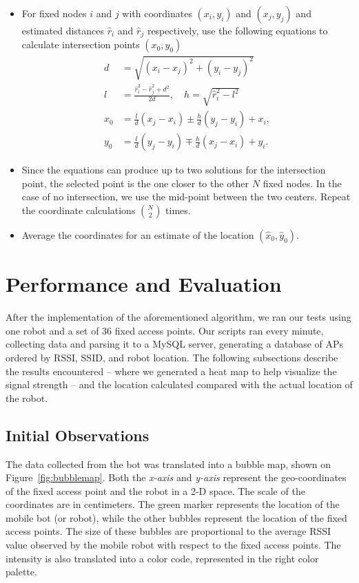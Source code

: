 \documentclass[journal]{IEEEtran} 				\IEEEoverridecommandlockouts 						\usepackage{amsmath,amssymb}
\begin{document}
 \begin{itemize}
 \item For fixed nodes $i$ and $j$ with coordinates $(x_i,y_i)$ and $(x_j,y_j)$ and estimated distances $\hat{r}_i$ and $\hat{r}_j$ respectively, use the following equations to calculate intersection points $(x_0,y_0)$
\begin{align*}
d&=\sqrt{(x_i-x_j)^2+(y_i-y_j)^2}\\
l&=\frac{\hat{r}_i^2-\hat{r}_j^2+d^2}{2d},\quad h=\sqrt{\hat{r}_i^2-l^2}\\
x_0&=\frac{l}{d}(x_j-x_i) \pm \frac{h}{d}(y_j-y_i) + x_i,\\
y_0&=\frac{l}{d}(y_j-y_i) \mp \frac{h}{d}(x_j-x_i) + y_i.
\end{align*}
\item Since the equations can produce up to two solutions for the intersection point,
the selected point is the one closer to the other $N$ fixed nodes. In the case of no intersection, we use the
mid-point between the two centers. Repeat the coordinate calculations $\binom{N}{2}$ times.

\item Average the coordinates for an estimate of the location $(\hat{x}_0, \hat{y}_0)$.
\end{itemize}

\section{Performance and Evaluation}\label{sec:Performance and Evaluation}
After the implementation of the aforementioned algorithm, we ran our tests using one robot and a set of 36 fixed access points. Our scripts ran every minute, collecting data and parsing it to a MySQL server, generating a database of APs ordered by RSSI, SSID, and robot location.
The following subsections describe the results encountered -- where we generated a heat map to help visualize the signal strength -- and the location calculated compared with the actual location of the robot.

\subsection{Initial Observations}\label{sec:heat}

The data collected from the bot was translated into a bubble map, shown on Figure~\ref{fig:bubblemap}. Both the \textit{x-axis} and \textit{y-axis} represent the geo-coordinates of the fixed access point and the robot in a 2-D space. The scale of the coordinates are in centimeters. The green marker represents the location of the mobile bot (or robot), while the other bubbles represent the location of the fixed access points. The size of these bubbles are proportional to the average RSSI value observed by the mobile robot with respect to the fixed access points. The intensity is also translated into a color code, represented in the right color palette.
\end{document}
